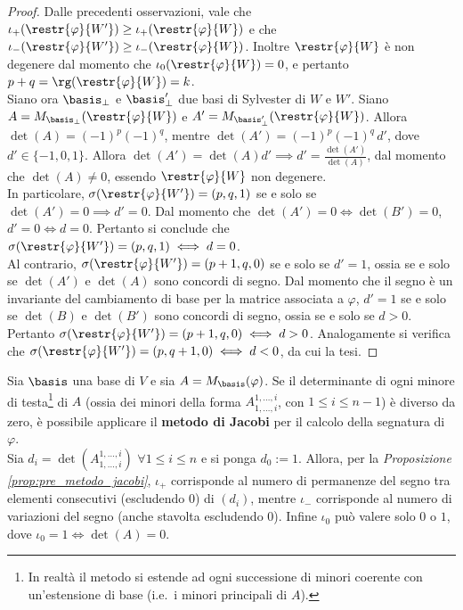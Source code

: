 \begin{proof}
	Dalle precedenti osservazioni, vale che $\iota_+(\restr{\varphi}{W'}) \geq \iota_+(\restr{\varphi}{W})$
	e che $\iota_-(\restr{\varphi}{W'}) \geq \iota_-(\restr{\varphi}{W})$. Inoltre $\restr{\varphi}{W}$
	è non degenere dal momento che $\iota_0(\restr{\varphi}{W}) = 0$, e pertanto
	$p + q = \rg(\restr{\varphi}{W}) = k$. \\
	
	Siano ora $\basis_\perp$ e $\basis_\perp'$ due basi di Sylvester di $W$ e $W'$. Siano $A = M_{\basis_\perp}(\restr{\varphi}{W})$
	e $A' = M_{\basis_\perp'}(\restr{\varphi}{W})$. Allora $\det(A) = (-1)^p (-1)^q$, mentre $\det(A') = (-1)^p (-1)^q \, d'$,
	dove $d' \in \{-1, 0, 1\}$. Allora $\det(A') = \det(A) d' \implies d' = \frac{\det(A')}{\det(A)}$, dal
	momento che $\det(A) \neq 0$, essendo $\restr{\varphi}{W}$ non degenere. \\
	
	In particolare, $\sigma(\restr{\varphi}{W'}) = (p, q, 1)$ se e solo se $\det(A') = 0 \implies d' = 0$. Dal
	momento che $\det(A') = 0 \iff \det(B') = 0$, $d' = 0 \iff d = 0$. Pertanto si conclude che
	$\sigma(\restr{\varphi}{W'}) = (p, q, 1) \iff d = 0$. \\
	
	Al contrario, $\sigma(\restr{\varphi}{W'}) = (p+1, q, 0)$ se e solo se $d' = 1$, ossia se e solo se $\det(A')$
	e $\det(A)$ sono concordi di segno. Dal momento che il segno è un invariante del cambiamento di base per la
	matrice associata a $\varphi$, $d' = 1$ se e solo se $\det(B)$ e $\det(B')$ sono concordi di segno, ossia
	se e solo se $d > 0$. Pertanto $\sigma(\restr{\varphi}{W'}) = (p+1, q, 0) \iff d > 0$. Analogamente si
	verifica che $\sigma(\restr{\varphi}{W'}) = (p, q+1, 0) \iff d < 0$, da cui la tesi.
\end{proof}

\begin{algorithm} \label{alg:metodo_jacobi}
	Sia $\basis$ una base di $V$ e sia $A = M_\basis(\varphi)$. Se il determinante di ogni minore di testa\footnote{In realtà il metodo si estende ad ogni successione di minori coerente con un'estensione di base (i.e.~i minori principali di $A$).}
	di $A$ (ossia dei minori della forma $A^{1, \ldots, i}_{1, \ldots, i}$, con $1 \leq i \leq n-1$) è diverso
	da zero, è possibile applicare il \textbf{metodo di Jacobi} per il calcolo della segnatura di $\varphi$. \\
	
	Sia $d_i = \det\left(A^{1,\ldots,i}_{1,\ldots,i}\right)$ $\forall 1 \leq i \leq n$ e si ponga $d_0 := 1$. Allora, per la \textit{Proposizione \ref{prop:pre_metodo_jacobi}}, $\iota_+$ corrisponde al numero di permanenze del segno
	tra elementi consecutivi (escludendo $0$) di $(d_i)$, mentre $\iota_-$ corrisponde al numero di variazioni
	del segno (anche stavolta escludendo $0$). Infine $\iota_0$ può valere solo $0$ o $1$, dove $\iota_0 = 1 \iff \det(A) = 0$.
\end{algorithm}

